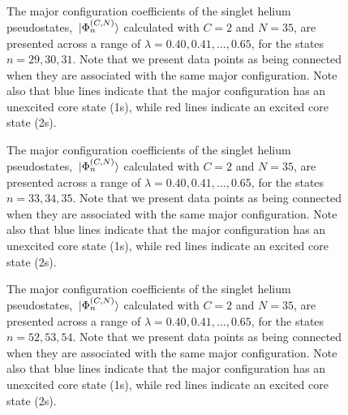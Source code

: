 \documentclass[]{article}
\begin{document}
\begin{figure}[h]
  \begin{center}
    
  \end{center}
  \caption[Major Configuration Coefficients: Auto-Ionising I]{
    The major configuration coefficients of the singlet helium pseudostates,
    $\ket*{\Phi_{n}^{(C, N)}}$ calculated with $C = 2$ and $N = 35$, are
    presented across a range of $\lambda = 0.40, 0.41, \dotsc, 0.65$, for the
    states $n = 29, 30, 31$.
    Note that we present data points as being connected when they are associated
    with the same major configuration.
    Note also that blue lines indicate that the major configuration has an
    unexcited core state (1s), while red lines indicate an excited core state
    (2s).
  }
  \label{fig:mcc_30}
\end{figure}

\begin{figure}[h]
  \begin{center}
    
  \end{center}
  \caption[Major Configuration Coefficients: Auto-Ionising II]{
    The major configuration coefficients of the singlet helium pseudostates,
    $\ket*{\Phi_{n}^{(C, N)}}$ calculated with $C = 2$ and $N = 35$, are
    presented across a range of $\lambda = 0.40, 0.41, \dotsc, 0.65$, for the
    states $n = 33, 34, 35$.
    Note that we present data points as being connected when they are associated
    with the same major configuration.
    Note also that blue lines indicate that the major configuration has an
    unexcited core state (1s), while red lines indicate an excited core state
    (2s).
  }
  \label{fig:mcc_34}
\end{figure}

\begin{figure}[h]
  \begin{center}
    
  \end{center}
  \caption[Major Configuration Coefficients: Excited-plus-Ionised]{
    The major configuration coefficients of the singlet helium pseudostates,
    $\ket*{\Phi_{n}^{(C, N)}}$ calculated with $C = 2$ and $N = 35$, are
    presented across a range of $\lambda = 0.40, 0.41, \dotsc, 0.65$, for the
    states $n = 52, 53, 54$.
    Note that we present data points as being connected when they are associated
    with the same major configuration.
    Note also that blue lines indicate that the major configuration has an
    unexcited core state (1s), while red lines indicate an excited core state
    (2s).
  }
  \label{fig:mcc_34}
\end{figure}
\end{document}

